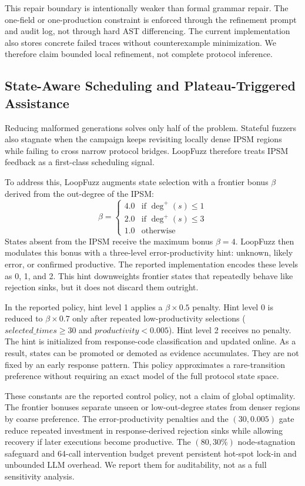 \documentclass[final,5p,times,number]{elsarticle}
\begin{document}
This repair boundary is intentionally weaker than formal grammar repair. The one-field or one-production constraint is enforced through the refinement prompt and audit log, not through hard AST differencing. The current implementation also stores concrete failed traces without counterexample minimization. We therefore claim bounded local refinement, not complete protocol inference.

\subsection{State-Aware Scheduling and Plateau-Triggered Assistance}
Reducing malformed generations solves only half of the problem. Stateful fuzzers also stagnate when the campaign keeps revisiting locally dense IPSM regions while failing to cross narrow protocol bridges. LoopFuzz therefore treats IPSM feedback as a first-class scheduling signal.

To address this, LoopFuzz augments state selection with a frontier bonus $\beta$ derived from the out-degree of the IPSM:
\[
\beta = \begin{cases}
4.0 & \text{if } \deg^+(s) \le 1 \\
2.0 & \text{if } \deg^+(s) \le 3 \\
1.0 & \text{otherwise}
\end{cases}
\]
States absent from the IPSM receive the maximum bonus $\beta{=}4$. LoopFuzz then modulates this bonus with a three-level error-productivity hint: unknown, likely error, or confirmed productive. The reported implementation encodes these levels as 0, 1, and 2. This hint downweights frontier states that repeatedly behave like rejection sinks, but it does not discard them outright.

In the reported policy, hint level 1 applies a $\beta{\times}0.5$ penalty. Hint level 0 is reduced to $\beta{\times}0.7$ only after repeated low-productivity selections ($\mathit{selected\_times}{\ge}30$ and $\mathit{productivity}{<}0.005$). Hint level 2 receives no penalty. The hint is initialized from response-code classification and updated online. As a result, states can be promoted or demoted as evidence accumulates. They are not fixed by an early response pattern. This policy approximates a rare-transition preference without requiring an exact model of the full protocol state space.

These constants are the reported control policy, not a claim of global optimality. The frontier bonuses separate unseen or low-out-degree states from denser regions by coarse preference. The error-productivity penalties and the $(30,0.005)$ gate reduce repeated investment in response-derived rejection sinks while allowing recovery if later executions become productive. The $(80,30\%)$ node-stagnation safeguard and 64-call intervention budget prevent persistent hot-spot lock-in and unbounded LLM overhead. We report them for auditability, not as a full sensitivity analysis.
\end{document}
